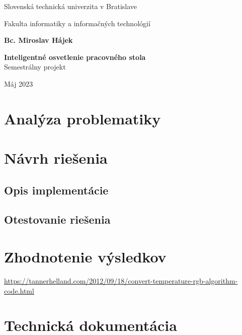 \documentclass[12pt, a4paper]{article}
\begin{document}
\begin{titlepage}
{\centering
    {\Large Slovenská technická univerzita v Bratislave}\par
    {\Large Fakulta informatiky a informačných technológií}\par
    \vspace{\medskipamount}
    \vfill
    \textbf{\large Bc. Miroslav Hájek}\par
    \vspace{1.5\bigskipamount}
    \Large \textbf{Inteligentné osvetlenie pracovného stola} \\
    \vspace{\bigskipamount}
    {\large Semestrálny projekt}\par
    \vfill
}
\normalsize    
\begin{flushleft}
Máj 2023
\end{flushleft}
\end{titlepage}

\thispagestyle{empty}


\tableofcontents
\newpage

\setcounter{page}{1}

\section{Analýza problematiky}

\section{Návrh riešenia}

\subsection{Opis implementácie}

\subsection{Otestovanie riešenia}

\section{Zhodnotenie výsledkov}

\printbibliography[title={Literatúra}]
\url{https://tannerhelland.com/2012/09/18/convert-temperature-rgb-algorithm-code.html}
\newpage

\section{Technická dokumentácia}
\end{document}
